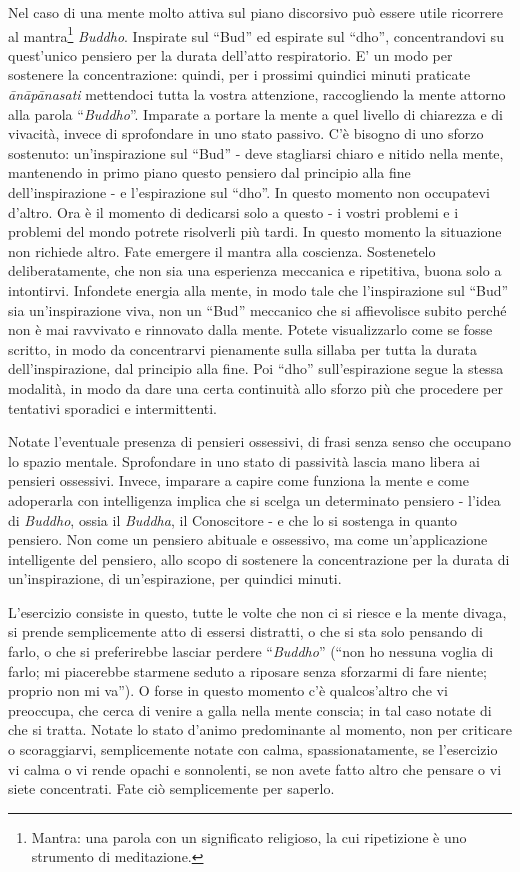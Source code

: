 
Nel caso di una mente molto attiva sul piano discorsivo può essere utile
ricorrere al mantra\footnote{Mantra: una parola con un significato religioso, la cui
ripetizione è uno strumento di meditazione.} \textit{Buddho}. Inspirate sul ``Bud” ed espirate
sul ``dho”, concentrandovi su quest'unico pensiero per la durata
dell'atto respiratorio. E' un modo per sostenere la concentrazione:
quindi, per i prossimi quindici minuti praticate \textit{ānāpānasati} mettendoci
tutta la vostra attenzione, raccogliendo la mente attorno alla parola
``\textit{Buddho}”. Imparate a portare la mente a quel livello di chiarezza e di
vivacità, invece di sprofondare in uno stato passivo. C'è bisogno di uno
sforzo sostenuto: un'inspirazione sul ``Bud” - deve stagliarsi chiaro e
nitido nella mente, mantenendo in primo piano questo pensiero dal
principio alla fine dell'inspirazione - e l'espirazione sul ``dho''. In
questo momento non occupatevi d'altro. Ora è il momento di dedicarsi
solo a questo - i vostri problemi e i problemi del mondo potrete
risolverli più tardi. In questo momento la situazione non richiede
altro. Fate emergere il mantra alla coscienza. Sostenetelo
deliberatamente, che non sia una esperienza meccanica e ripetitiva,
buona solo a intontirvi. Infondete energia alla mente, in modo tale che
l'inspirazione sul ``Bud'' sia un'inspirazione viva, non un ``Bud''
meccanico che si affievolisce subito perché non è mai ravvivato e
rinnovato dalla mente. Potete visualizzarlo come se fosse scritto, in
modo da concentrarvi pienamente sulla sillaba per tutta la durata
dell'inspirazione, dal principio alla fine. Poi ``dho'' sull'espirazione
segue la stessa modalità, in modo da dare una certa continuità allo
sforzo più che procedere per tentativi sporadici e intermittenti.

Notate l'eventuale presenza di pensieri ossessivi, di frasi senza senso
che occupano lo spazio mentale. Sprofondare in uno stato di passività
lascia mano libera ai pensieri ossessivi. Invece, imparare a capire come
funziona la mente e come adoperarla con intelligenza implica che si
scelga un determinato pensiero - l'idea di \textit{Buddho}, ossia il \textit{Buddha}, il
Conoscitore - e che lo si sostenga in quanto pensiero. Non come un
pensiero abituale e ossessivo, ma come un'applicazione intelligente del
pensiero, allo scopo di sostenere la concentrazione per la durata di
un'inspirazione, di un'espirazione, per quindici minuti.

L'esercizio consiste in questo, tutte le volte che non ci si riesce e la
mente divaga, si prende semplicemente atto di essersi distratti, o che
si sta solo pensando di farlo, o che si preferirebbe lasciar perdere
``\textit{Buddho}'' (``non ho nessuna voglia di farlo; mi piacerebbe starmene seduto
a riposare senza sforzarmi di fare niente; proprio non mi va''). O forse
in questo momento c'è qualcos'altro che vi preoccupa, che cerca di
venire a galla nella mente conscia; in tal caso notate di che si tratta.
Notate lo stato d'animo predominante al momento, non per criticare o
scoraggiarvi, semplicemente notate con calma, spassionatamente, se
l'esercizio vi calma o vi rende opachi e sonnolenti, se non avete fatto
altro che pensare o vi siete concentrati. Fate ciò semplicemente per
saperlo.


